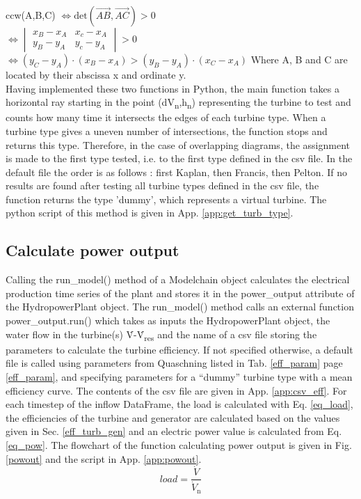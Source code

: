 ccw(A,B,C) \tabto{2.5cm}$\iff \mathrm{det}(\overrightarrow{AB},\overrightarrow{AC})>0$\newline \\
\tabto{2.5cm}$\iff \begin{vmatrix}x_B-x_A&x_c-x_A\\y_B-y_A&y_c-y_A\end{vmatrix}>0$\newline\\
\tabto{2.5cm}$\iff (y_C-y_A)\cdot(x_B-x_A) > (y_B-y_A)\cdot(x_C-x_A)$ \newline
Where A, B and C are located by their abscissa x and ordinate y. \newline
\\
Having implemented these two functions in Python, the main function takes a horizontal ray starting in the point (dV\textsubscript{n},h\textsubscript{n}) representing the turbine to test and counts how many time it intersects the edges of each turbine type. When a turbine type gives a uneven number of intersections, the function stops and returns this type. Therefore, in the case of overlapping diagrams, the assignment is made to the first type tested, i.e. to the first type defined in the csv file. In the default file the order is as follows : first Kaplan, then Francis, then Pelton. If no results are found after testing all turbine types defined in the csv file, the function returns the type 'dummy', which represents a virtual turbine. The python script of this method is given in App. \ref{app:get_turb_type}.

\subsection{Calculate power output}

Calling the run{\_}model() method of a Modelchain object calculates the electrical production time series of the plant and stores it in the power{\_}output attribute of the HydropowerPlant object. The run{\_}model() method calls an external function power{\_}output.run() which takes as inputs the HydropowerPlant object, the water flow in the turbine(s) \.{V}-\.{V}\textsubscript{res} and the name of a csv file storing the parameters to calculate the turbine efficiency. If not specified otherwise, a default file is called using parameters from Quaschning \cite{quaschning} listed in Tab. \ref{eff_param} page \ref{eff_param}, and specifying parameters for a ``dummy'' turbine type with a mean efficiency curve. The contents of the csv file are given in App. \ref{app:csv_eff}. \newline
For each timestep of the inflow DataFrame, the load is calculated with Eq. \eqref{eq_load}, the efficiencies of the turbine and generator are calculated based on the values given in Sec. \ref{eff_turb_gen} and an electric power value is calculated from Eq. \eqref{eq_pow}. The flowchart of the function calculating power output is given in Fig. \ref{powout} and the script in App. \ref{app:powout}.
\begin{equation}
 \label{eq_load}
 load = \frac{\dot{V}}{\dot{V}_\mathrm{n}}
\end{equation}


